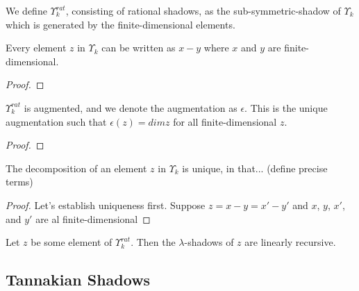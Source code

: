\begin{definition}
  We define $\Upsilon_k^{rat}$, consisting of rational shadows, as the sub-symmetric-shadow of $\Upsilon_k$ which is generated by the finite-dimensional elements. 
\end{definition}



\begin{proposition}
  Every element $z$ in $\Upsilon_k$ can be written as $x - y$ where $x$ and $y$ are finite-dimensional.
\end{proposition}

\begin{proof}
  
\end{proof}

\begin{propdef}
  $\Upsilon_k^{rat}$ is augmented, and we denote the augmentation as $\epsilon$. This is the unique augmentation such that $\epsilon(z) = dim z$ for all finite-dimensional $z$.
\end{propdef}

\begin{proof}
  
\end{proof}

\begin{proposition}
  The decomposition of an element $z$ in $\Upsilon_k$ is unique, in that... (define precise terms)
\end{proposition}

\begin{proof}
  Let's establish uniqueness first. Suppose $z = x - y = x' - y'$ and $x$, $y$, $x'$, and $y'$ are al finite-dimensional
\end{proof}

\begin{proposition}
  Let $z$ be some element of $\Upsilon_k^{rat}$. Then the $\lambda$-shadows of $z$ are linearly recursive. 
\end{proposition}

\subsection{Tannakian Shadows}
